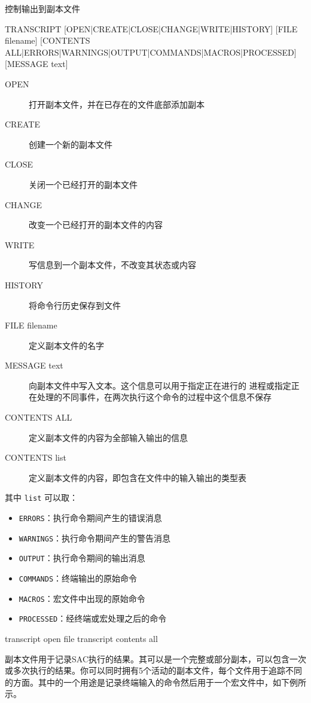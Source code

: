 \label{cmd:transcript}

控制输出到副本文件

\begin{SACSTX}
TRANSCRIPT [OPEN|CREATE|CLOSE|CHANGE|WRITE|HISTORY] [FILE filename]
    [CONTENTS ALL|ERRORS|WARNINGS|OUTPUT|COMMANDS|MACROS|PROCESSED]
    [MESSAGE text]
\end{SACSTX}

\begin{description}
\item [OPEN] 打开副本文件，并在已存在的文件底部添加副本
\item [CREATE] 创建一个新的副本文件
\item [CLOSE] 关闭一个已经打开的副本文件
\item [CHANGE] 改变一个已经打开的副本文件的内容
\item [WRITE] 写信息到一个副本文件，不改变其状态或内容
\item [HISTORY] 将命令行历史保存到文件
\item [FILE filename] 定义副本文件的名字
\item [MESSAGE text] 向副本文件中写入文本。这个信息可以用于指定正在进行的
    进程或指定正在处理的不同事件，在两次执行这个命令的过程中这个信息不保存
\item [CONTENTS ALL] 定义副本文件的内容为全部输入输出的信息
\item [CONTENTS list] 定义副本文件的内容，即包含在文件中的输入输出的类型表
\end{description}
其中 \texttt{list} 可以取：
\begin{itemize}
\item \texttt{ERRORS}：执行命令期间产生的错误消息
\item \texttt{WARNINGS}：执行命令期间产生的警告消息
\item \texttt{OUTPUT}：执行命令期间的输出消息
\item \texttt{COMMANDS}：终端输出的原始命令
\item \texttt{MACROS}：宏文件中出现的原始命令
\item \texttt{PROCESSED}：经终端或宏处理之后的命令
\end{itemize}

\begin{SACDFT}
transcript open file transcript contents all
\end{SACDFT}

副本文件用于记录SAC执行的结果。其可以是一个完整或部分副本，可以包含一次
或多次执行的结果。你可以同时拥有5个活动的副本文件，每个文件用于追踪不同
的方面。其中的一个用途是记录终端输入的命令然后用于一个宏文件中，如下例所示。

